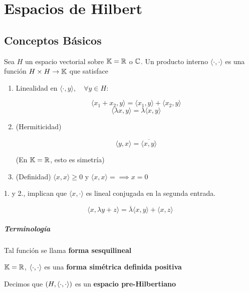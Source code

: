 \chapter{Espacios de Hilbert}

\section{Conceptos Básicos}

\begin{fdefinition}
    Sea $H$ un espacio vectorial sobre $\mathbb{K}=\mathbb{R}$ o $\mathbb{C}$. Un producto interno $\langle \cdot,\cdot\rangle$ es una función $H\times H\to \mathbb{K}$ que satisface

    \begin{enumerate}
        \item Linealidad en $\langle\cdot,y\rangle,\quad \forall y\in H$:
        
        \[\langle x_1+x_2,y\rangle=\langle x_1,y\rangle+\langle x_2,y\rangle\]
        \[\langle \lambda x,y\rangle = \lambda \langle x,y\rangle\]

        \item (Hermiticidad)
        
        \[\langle y,x\rangle=\overline{\langle x,y\rangle}\]

        (En $\mathbb{K}=\mathbb{R}$, esto es simetría)

        \item (Definidad) $\langle x,x\rangle\geq 0$ y $\langle x,x\rangle=\implies x=0$
    \end{enumerate}
\end{fdefinition}

\begin{fnote}
    1. y 2., implican que $\langle x,\cdot\rangle$ es lineal conjugada en la segunda entrada.

    \[\langle x,\lambda y+z\rangle=\overline{\lambda}\langle x,y\rangle + \langle x,z\rangle\]
\end{fnote}

\paragraph*{Terminología} Tal función se llama \textbf{forma sesquilineal}

\begin{fnote}
    $\mathbb{K}=\mathbb{R}$, $\left\langle \cdot,\cdot\right\rangle$ es una \textbf{forma simétrica definida positiva}
\end{fnote}

Decimos que $(H,\left\langle \cdot,\cdot\right\rangle)$ es un \textbf{espacio pre-Hilbertiano}

